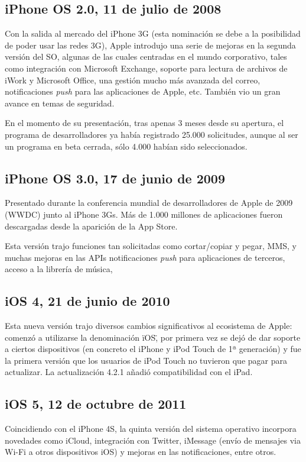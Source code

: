 \subsection{iPhone OS 2.0, 11 de julio de 2008}
Con la salida al mercado del iPhone 3G (esta nominación se debe a la posibilidad de poder usar las redes 3G), Apple introdujo una serie de mejoras en la segunda versión del SO, algunas de las cuales centradas en el mundo corporativo, tales como integración con Microsoft Exchange, soporte para lectura de archivos de iWork y Microsoft Office, una gestión mucho más avanzada del correo, notificaciones \emph{push} para las aplicaciones de Apple, etc. También vio un gran avance en temas de seguridad.

En el momento de su presentación, tras apenas 3 meses desde su apertura, el programa de desarrolladores ya había registrado 25.000 solicitudes, aunque al ser un programa en beta cerrada, sólo 4.000 habían sido seleccionados.

\subsection{iPhone OS 3.0, 17 de junio de 2009}
Presentado durante la conferencia mundial de desarrolladores de Apple de 2009 (WWDC) junto al iPhone 3Gs. Más de 1.000 millones de aplicaciones fueron descargadas desde la aparición de la App Store.

Esta versión trajo funciones tan solicitadas como cortar/copiar y pegar, MMS, y muchas mejoras en las APIs notificaciones \emph{push} para aplicaciones de terceros, acceso a la librería de música, 

\subsection{iOS 4, 21 de junio de 2010}
Esta nueva versión trajo diversos cambios significativos al ecosistema de Apple: comenzó a utilizarse la denominación \"iOS\", por primera vez se dejó de dar soporte a ciertos dispositivos (en concreto el iPhone y iPod Touch de 1ª generación) y fue la primera versión que los usuarios de iPod Touch no tuvieron que pagar para actualizar. La actualización 4.2.1 añadió compatibilidad con el iPad.

\subsection{iOS 5, 12 de octubre de 2011}
Coincidiendo con el iPhone 4S, la quinta versión del sistema operativo incorpora novedades como iCloud, integración con Twitter, iMessage (envío de mensajes via Wi-Fi a otros dispositivos iOS) y mejoras en las notificaciones, entre otros.

